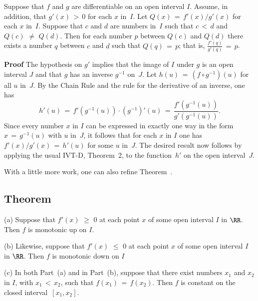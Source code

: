\V


        Suppose that $f$ and $g$ are differentiable on an open interval $I$. Assume, in addition, that $g'(x)\,>\,0$ for each $x$ in~$I$.
    Let $Q(x) \,=\, f'(x)/g'(x)$ for each $x$ in~$I$.
    Suppose that $c$ and $d$ are numbers in~$I$ such that $c\,<\,d$ and $Q(c) \,\,{\neq}\,\, Q(d)$.
    Then for each number $p$ between $Q(c)$ and $Q(d)$ there exists a number $q$ between $c$ and $d$ such that $Q(q) \,=\, p$;
    that is, ${\displaystyle \frac{f'(q)}{g'(q)}\,=\,p}$.

\V

        {\bf Proof} The hypothesis on $g'$ implies that the image of $I$ under $g$ is an open interval $J$ and that $g$ has an inverse $g^{-1}$ on~$J$.
    Let $h(u) \,=\, (f{\circ}g^{-1})(u)$ for all $u$ in~$J$. By the Chain Rule and the rule for the derivative of an inverse, one has
        \begin{displaymath}
        h'(u) \,=\, f'(g^{-1}(u)){\cdot}(g^{-1})'(u) \,=\, \frac{f'(g^{-1}(u))}{g'(g^{-1}(u))}.
        \end{displaymath}
    Since every number $x$ in $I$ can be expressed in exactly one way in the form $x \,=\, g^{-1}(u)$ with $u$ in~$J$,
    it follows that for each $x$ in $I$ one has $f'(x)/g'(x) \,=\, h'(u)$ for some $u$ in~$J$.
    The desired result now follows by applying the usual IVT-D, Theorem~2, to the function~$h'$ on the open interval~$J$.


\VV

        With a little more work, one can also refine Theorem~.

\V

            \subsection{\small{\bf Theorem}}
            \label{ThmE40.40}

\V

\hspace*{\parindent}(a) Suppose that $f'(x)\,\,{\geq}\,\,0$ at each point $x$ of some open interval $I$ in ${\RR}$. Then $f$ is monotonic up on $I$.

\V

        (b) Likewise, suppose that $f'(x)\,\,{\leq}\,\,0$ at each point $x$ of some open interval $I$ in ${\RR}$. Then $f$ is monotonic down on $I$

\V

        (c) In both Part~(a) and in Part~(b), suppose that there exist numbers $x_{1}$ and $x_{2}$ in $I$, with $x_{1}\,<\,x_{2}$,
    such that $f(x_{1}) \,=\, f(x_{2})$. Then $f$ is constant on the closed interval~$[x_{1},x_{2}]$.

